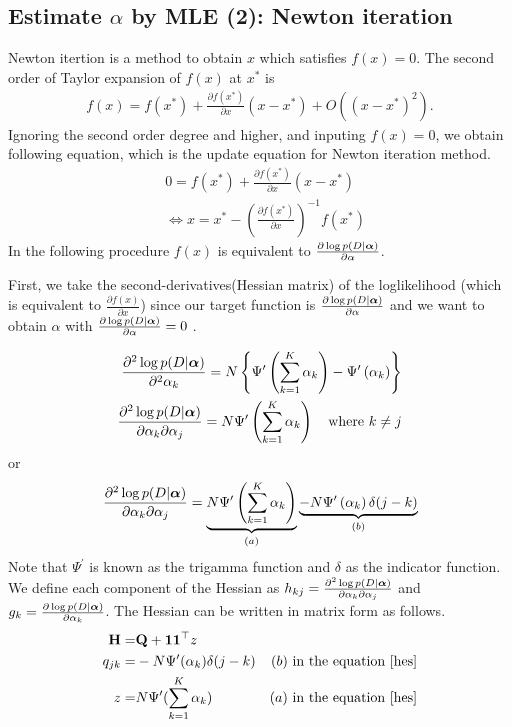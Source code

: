 \documentclass[10.5pt,letterpaper]{article}
\theoremstyle{plain}
\begin{document}
\subsection{Estimate $\alpha$ by MLE (2): Newton iteration}

Newton itertion is a method to obtain $x$ which satisfies $f(x) = 0$.
The second order of Taylor expansion of $f(x)$ at $x^*$ is
\begin{align}
f(x) = f(x^*) + \frac{\partial f(x^*) }{\partial x} (x - x^*) + O((x-x^*)^2).
\end{align}
Ignoring the second order degree and higher, and inputing $f(x) = 0$, we obtain following equation, which is the update equation for Newton iteration method.
\begin{align}
& 0 = f(x^*) + \frac{\partial f(x^*) }{\partial x} (x - x^*)\\
& \Leftrightarrow x = x^* - \left( \frac{\partial f(x^*) }{\partial x} \right)^{-1} f(x^*) \label{newtonex}
\end{align}
In the following procedure $f(x)$ is equivalent to $\frac{\partial \log p(D| \boldsymbol{\alpha})}{\partial \alpha}$.

First, we take the second-derivatives(Hessian matrix) of the loglikelihood (which is equivalent to $\frac{\partial f(x) }{\partial x}$) since our target function is $\frac{\partial \log p(D| \boldsymbol{\alpha})}{\partial \alpha}$ and we want to obtain $\alpha$ with $\frac{\partial \log p(D| \boldsymbol{\alpha})}{\partial \alpha}= 0$ .

\begin{align}
\frac{\partial^2 \log p(D| \boldsymbol{\alpha}) }{\partial^2 \alpha_k} = N \left\{ \Psi^\prime \left( \sum_{k=1}^K \alpha_k \right) - \Psi^\prime \left( \alpha_k \right) \right\}\\
\frac{\partial^2 \log p(D| \boldsymbol{\alpha}) }{\partial \alpha_k \partial \alpha_j } = N  \Psi^\prime \left( \sum_{k=1}^K \alpha_k \right) \quad \textrm{where $k \neq j$}
\end{align}
or 
\begin{align}
\frac{\partial^2 \log p(D| \boldsymbol{\alpha}) }{\partial \alpha_k \partial \alpha_j} = 
\underbrace{N \Psi^\prime \left( \sum_{k=1}^K \alpha_k \right)}_{(a)} \underbrace{- N\Psi^\prime \left( \alpha_k \right) \delta(j-k)}_{(b)} \label{hes}
\end{align}
Note that $\Psi^\prime$ is known as the trigamma function and $\delta$ as the indicator function.
We define each component of the Hessian as $h_{kj} = {\frac{\partial^2 \log p(D| \boldsymbol{\alpha}) }{\partial \alpha_k \partial \alpha_j}}$ and $g_k = \frac{\partial \log p(D| \boldsymbol{\alpha})}{\partial \alpha_k}$.
The Hessian can be written in matrix form as follows.
\begin{align}
\mathbf{H} = & \mathbf{Q} + \mathbf{1} \mathbf{1} ^\top z \\
q_{jk} = & - N \Psi^\prime (\alpha_k) \delta(j-k) & \textrm{$(b)$ in the equation \eqref{hes}}\\
z =& N \Psi^\prime (\sum_{k=1}^K \alpha_k) & \textrm{$(a)$ in the equation \eqref{hes}}
\end{align}
\end{document}
